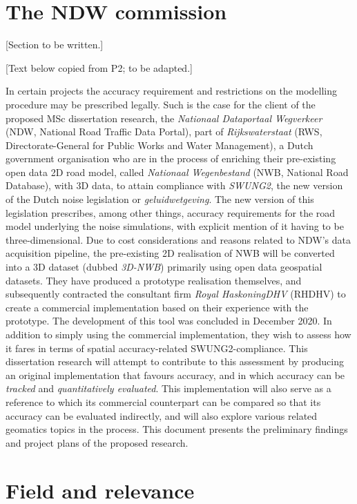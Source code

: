 \section{The NDW commission}
\label{sec:commission}

[Section to be written.]

[Text below copied from P2; to be adapted.]

In certain projects the accuracy requirement and restrictions on the modelling procedure may be prescribed legally. Such is the case for the client of the proposed MSc dissertation research, the \textit{Nationaal Dataportaal Wegverkeer} (NDW, National Road Traffic Data Portal), part of \textit{Rijkswaterstaat} (RWS, Directorate-General for Public Works and Water Management), a Dutch government organisation who are in the process of enriching their pre-existing open data 2D road model, called \textit{Nationaal Wegenbestand} (NWB, National Road Database), with 3D data, to attain compliance with \textit{SWUNG2}, the new version of the Dutch noise legislation or \textit{geluidwetgeving}. The new version of this legislation prescribes, among other things, accuracy requirements for the road model underlying the noise simulations, with explicit mention of it having to be three-dimensional. Due to cost considerations and reasons related to NDW’s data acquisition pipeline, the pre-existing 2D realisation of NWB will be converted into a 3D dataset (dubbed \textit{3D-NWB}) primarily using open data geospatial datasets. They have produced a prototype realisation themselves, and subsequently contracted the consultant firm \textit{Royal HaskoningDHV} (RHDHV) to create a commercial implementation based on their experience with the prototype. The development of this tool was concluded in December 2020. In addition to simply using the commercial implementation, they wish to assess how it fares in terms of spatial accuracy-related SWUNG2-compliance. This dissertation research will attempt to contribute to this assessment by producing an original implementation that favours accuracy, and in which accuracy can be \textit{tracked} and \textit{quantitatively evaluated}. This implementation will also serve as a reference to which its commercial counterpart can be compared so that its accuracy can be evaluated indirectly, and will also explore various related geomatics topics in the process. This document presents the preliminary findings and project plans of the proposed research.

\section{Field and relevance}

